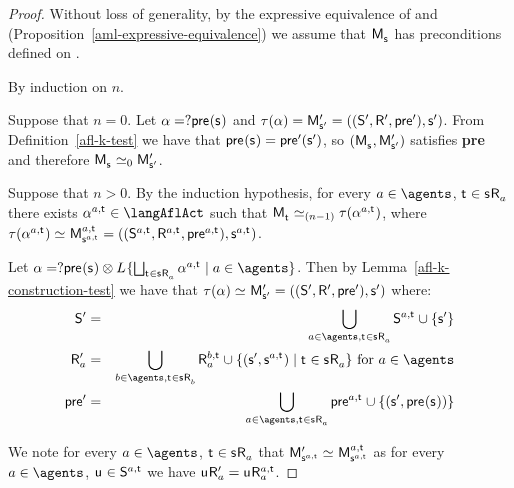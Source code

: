\begin{proof}
Without loss of generality, by the expressive equivalence of \logicAmlK{} and \logicK{} (Proposition~\ref{aml-expressive-equivalence}) we assume that $\aPModel{\aStateS}$ has preconditions defined on \langMl{}.

By induction on $n$.

Suppose that $n = 0$.
Let $\alpha = \test{\aPrecondition(\aStateS)}$ and $\tau(\alpha) = \aPModelP{\aStateSP} = \aPModelTupleP{\aStateSP}$.
From Definition~\ref{afl-k-test} we have that $\aPrecondition(\aStateS) = \aPreconditionP(\aStateSP)$, so $(\aPModel{\aStateS}, \aPModelP{\aStateSP})$ satisfies {\bf pre} and therefore $\aPModel{\aStateS} \bisimilar[0] \aPModelP{\aStateSP}$.

Suppose that $n > 0$. 
By the induction hypothesis, for every $\agentA \in \agents$, $\aStateT \in \aStateS \aAccessibility{\agentA}$ there exists $\alpha^{\agentA,\aStateT} \in \langAflAct$ such that $\aPModel{\aStateT} \bisimilar[(n - 1)] \tau(\alpha^{\agentA,\aStateT})$, where $\tau(\alpha^{\agentA,\aStateT}) \bisimilar \aPModel[\agentA,\aStateT]{\aStateS[\agentA,\aStateT]} = \aPModelTuple[\agentA,\aStateT]{\aStateS[\agentA,\aStateT]}$.

Let $\alpha = \test{\aPrecondition(\aStateS)} \compose \learns \{\bigchoice_{\aStateT \in \aStateS \aAccessibility{\agentA}} \alpha^{\agentA,\aStateT} \mid \agentA \in \agents\}$.
Then by Lemma~\ref{afl-k-construction-test} we have that $\tau(\alpha) \bisimilar \aPModelP{\aStateSP} = \aPModelTupleP{\aStateSP}$ where:
\begin{eqnarray*}
    \aStatesP &=& \bigcup_{\agentA \in \agents, \aStateT \in \aStateS \aAccessibility{\agentA}} \aStates[\agentA,\aStateT] \cup \{\aStateSP\}\\
    \aAccessibilityP{\agentA} &=& \bigcup_{\agentB \in \agents, \aStateT \in \aStateS \aAccessibility{\agentB}} \aAccessibility[\agentB,\aStateT]{\agentA} \cup \{(\aStateSP, \aStateS[\agentA,\aStateT]) \mid \aStateT \in \aStateS \aAccessibility{\agentA}\} \text{ for } \agentA \in \agents\\
    \aPreconditionP &=& \bigcup_{\agentA \in \agents, \aStateT \in \aStateS \aAccessibility{\agentA}} \aPrecondition[\agentA,\aStateT] \cup \{(\aStateSP, \aPrecondition(\aStateS))\}
\end{eqnarray*}

We note for every $\agentA \in \agents$, $\aStateT \in \aStateS \aAccessibility{\agentA}$ that $\aPModelP{\aStateS[\agentA,\aStateT]} \bisimilar \aPModel[\agentA,\aStateT]{\aStateS[\agentA,\aStateT]}$ as for every $\agentA \in \agents$, $\aStateU \in \aStates[\agentA,\aStateT]$ we have $\aStateU \aAccessibilityP{\agentA} = \aStateU \aAccessibility[\agentA,\aStateT]{\agentA}$.


\end{proof}
